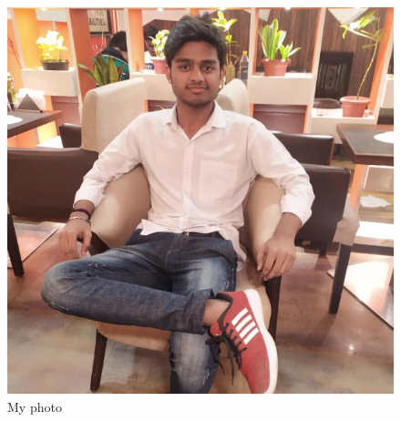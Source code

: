 \documentclass{article}
\begin{document}
  \begin{figure}
    \includegraphics[width=\linewidth]{Personal.jpeg}
    \caption{My photo}
    \label{fig:aman}
  \end{figure}
\end{document}
